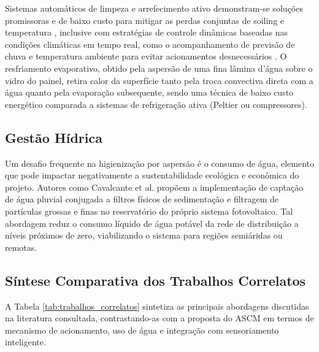 \documentclass[12pt, a4paper]{article}
\begin{document}
Sistemas automáticos de limpeza e arrefecimento ativo demonstram-se soluções promissoras e de baixo custo para mitigar as perdas conjuntas de soiling e temperatura \cite{derakhshandeh2021}, inclusive com estratégias de controle dinâmicas baseadas nas condições climáticas em tempo real, como o acompanhamento de previsão de chuva e temperatura ambiente para evitar acionamentos desnecessários \cite{mendis2026}. O resfriamento evaporativo, obtido pela aspersão de uma fina lâmina d'água sobre o vidro do painel, retira calor da superfície tanto pela troca convectiva direta com a água quanto pela evaporação subsequente, sendo uma técnica de baixo custo energético comparada a sistemas de refrigeração ativa (Peltier ou compressores).

\subsection{Gestão Hídrica}

Um desafio frequente na higienização por aspersão é o consumo de água, elemento que pode impactar negativamente a sustentabilidade ecológica e econômica do projeto. Autores como Cavalcante et al. \cite{cavalcante2016} propõem a implementação de captação de água pluvial conjugada a filtros físicos de sedimentação e filtragem de partículas grossas e finas no reservatório do próprio sistema fotovoltaico. Tal abordagem reduz o consumo líquido de água potável da rede de distribuição a níveis próximos de zero, viabilizando o sistema para regiões semiáridas ou remotas.

\subsection{Síntese Comparativa dos Trabalhos Correlatos}

A Tabela \ref{tab:trabalhos_correlatos} sintetiza as principais abordagens discutidas na literatura consultada, contrastando-as com a proposta do ASCM em termos de mecanismo de acionamento, uso de água e integração com sensoriamento inteligente.
\end{document}
